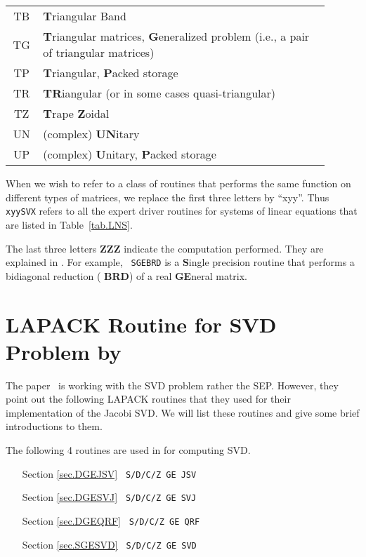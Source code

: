 \documentclass{article}
\renewcommand{\bf}[1]{\textsf{\bfseries \color{purple} #1}}
\newcommand{\code}[1]{\texttt{\color{green!30!black} #1}}
\begin{document}
\begin{table}[ht]
\begin{tabular}{c p{0.9\linewidth}}
        TB & \bf{T}riangular {B}and \\
        TG & \bf{T}riangular matrices, \bf{G}eneralized problem (i.e., a pair of triangular matrices)\\
        TP & \bf{T}riangular, \bf{P}acked storage\\
        TR & \bf{TR}iangular (or in some cases quasi-triangular)\\
        TZ & \bf{T}rape\bf{Z}oidal\\
        UN & (complex) \bf{UN}itary\\
        UP & (complex) \bf{U}nitary, \bf{P}acked storage\\
        \bottomrule
    \end{tabular}
\end{table}
When we wish to refer to a class of routines that performs the same
function on different types of matrices, we replace the first three
letters by ``xyy''. Thus \code{xyySVX} refers to all the expert driver
routines for systems of linear equations that are listed in
Table~\ref{tab.LNS}.

The last three letters \bf{ZZZ} indicate the computation performed. They
are explained in .
For example, \code{SGEBRD} is a \bf{S}ingle precision routine that
performs a bidiagonal reduction (\bf{BRD}) of a real \bf{GE}neral
matrix. 

\newpage
\section{LAPACK Routine for SVD Problem by \cite{gms22}}

The paper~\cite{gms22} is working with the SVD problem rather
the SEP. However, they point out the following LAPACK routines that they
used for their implementation of the Jacobi SVD. We will list these
routines and give some brief introductions to them.

The following 4 routines are used in \cite{gms22} for computing
SVD. 
\begin{itemize}[nosep]
    \item[Section \ref{sec.DGEJSV}] \code{S/D/C/Z GE JSV}
    \item[Section \ref{sec.DGESVJ}] \code{S/D/C/Z GE SVJ}
    \item[Section \ref{sec.DGEQRF}] \code{S/D/C/Z GE QRF}
    \item[Section \ref{sec.SGESVD}] \code{S/D/C/Z GE SVD}
\end{itemize}
\end{document}
